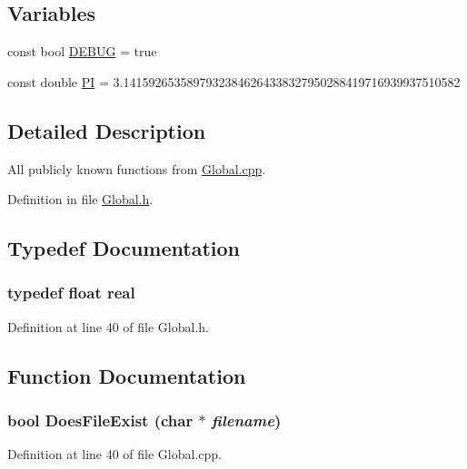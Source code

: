 \subsection*{Variables}
\begin{DoxyCompactItemize}
\item 
const bool \hyperlink{Global_8h_a9c4ab189c2f018bc7ccc8ba4f6e04b9d}{DEBUG} = true
\item 
const double \hyperlink{Global_8h_a952eac791b596a61bba0a133a3bb439f}{PI} = 3.14159265358979323846264338327950288419716939937510582
\end{DoxyCompactItemize}


\subsection{Detailed Description}
All publicly known functions from \hyperlink{Global_8cpp}{Global.cpp}. 

Definition in file \hyperlink{Global_8h_source}{Global.h}.



\subsection{Typedef Documentation}
\subsubsection[{real}]{\setlength{\rightskip}{0pt plus 5cm}typedef float {\bf real}}\label{Global_8h_a031f8951175b43076c2084a6c2173410}


Definition at line 40 of file Global.h.



\subsection{Function Documentation}
\subsubsection[{DoesFileExist}]{\setlength{\rightskip}{0pt plus 5cm}bool DoesFileExist (char $\ast$ {\em filename})}\label{Global_8h_a1c4c7d9ff8a31be4d5076c817d1297e3}


Definition at line 40 of file Global.cpp.



